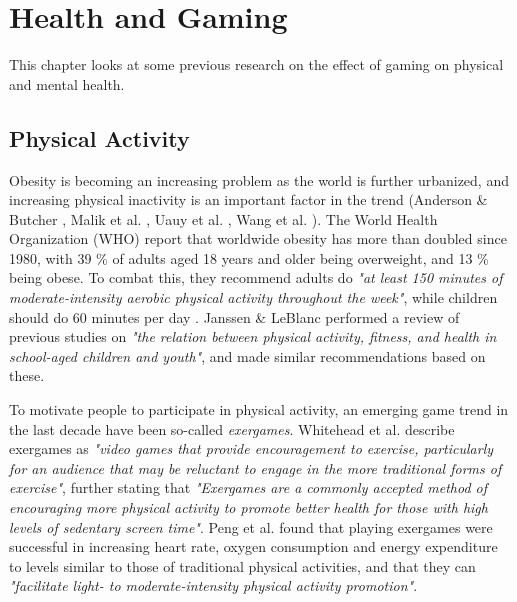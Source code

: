 
\chapter{Health and Gaming}
\label{chapter:lit-study-modern-health}

This chapter looks at some previous research on the effect of gaming on physical and mental health.

\section{Physical Activity}
\label{sec:lit-study-physical-activity}

Obesity is becoming an increasing problem as the world is further urbanized, and increasing physical inactivity is an important factor in the trend (Anderson \& Butcher \cite{anderson2006childhood}, Malik et al. \cite{malik2013global}, Uauy et al. \cite{uauy2001obesity}, Wang et al. \cite{wang2011health}). The World Health Organization (WHO) \cite{WHOobesity} report that worldwide obesity has more than doubled since 1980, with 39 \% of adults aged 18 years and older being overweight, and 13 \% being obese. To combat this, they recommend adults do \emph{"at least 150 minutes of moderate-intensity aerobic physical activity throughout the week"}, while children should do 60 minutes per day \cite{WHOphysical}. Janssen \& LeBlanc \cite{janssen2010systematic} performed a review of previous studies on \emph{"the relation between physical activity, fitness, and health in school-aged children and youth"}, and made similar recommendations based on these.

To motivate people to participate in physical activity, an emerging game trend in the last decade have been so-called \emph{exergames}. Whitehead et al. \cite{whitehead2010exergame} describe exergames as \emph{"video games that provide encouragement to exercise, particularly for an audience that may be reluctant to engage in the more traditional forms of exercise"}, further stating that \emph{"Exergames are a commonly accepted method of encouraging more physical activity to promote better health for those with high levels of sedentary screen time"}. Peng et al. \cite{peng2011playing} found that playing exergames were successful in increasing heart rate, oxygen consumption and energy expenditure to levels similar to those of traditional physical activities, and that they can \emph{"facilitate light- to moderate-intensity physical activity promotion"}.

